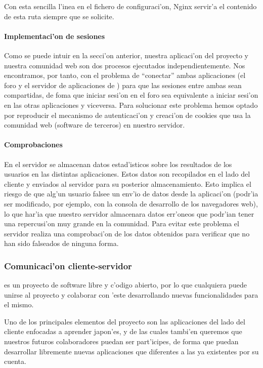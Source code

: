 Con esta sencilla l'inea en el fichero de configuraci'on, Nginx servir'a el contenido de esta ruta siempre que se solicite.

\paragraph{Implementaci'on de sesiones}


Como se puede intuir en la secci'on anterior, nuestra aplicaci'on del proyecto y nuestra comunidad web son dos procesos ejecutados independientemente.
Nos encontramos, por tanto, con el problema de ``conectar'' ambas aplicaciones (el foro y el servidor de aplicaciones de \Nipponline{}) para que las
sesiones entre ambas sean compartidas, de foma que iniciar sesi'on en el foro sea equivalente a iniciar sesi'on en las otras aplicaciones y viceversa.
Para solucionar este problema hemos optado por reproducir el mecanismo de autenticaci'on y creaci'on de cookies que usa la comunidad web (software de terceros)
en nuestro servidor.

\paragraph{Comprobaciones}


En el servidor se almacenan datos estad'isticos sobre los resultados de los usuarios en las distintas aplicaciones. Estos datos son recopilados en el lado
del cliente y enviados al servidor para su posterior almacenamiento. Esto implica el riesgo de que alg'un usuario falsee un env'io de datos desde la aplicaci'on
(podr'ia ser modificado, por ejemplo, con la consola de desarrollo de los navegadores web), lo que har'ia que nuestro servidor almacenara datos err'oneos que
podr'ian tener una repercusi'on muy grande en la comunidad. Para evitar este problema el servidor realiza una comprobaci'on de los datos obtenidos para
verificar que no han sido falseados de ninguna forma.

\subsubsection[Comunicaci'on cliente-servidor (SBP)]{Comunicaci'on cliente-servidor}
\label{sub:comunicacion_cliente_servidor}

\Nipponline{} es un proyecto de software libre y c'odigo abierto, por lo que cualquiera puede unirse al proyecto y
colaborar con 'este desarrollando nuevas funcionalidades para el mismo.

Uno de los principales elementos del proyecto son las aplicaciones del lado del cliente enfocadas a aprender
japon'es, y de las cuales tambi'en queremos que nuestros futuros colaboradores puedan ser part'icipes, de forma que
puedan desarrollar libremente nuevas aplicaciones que diferentes a las ya existentes por su cuenta.

